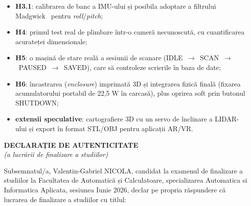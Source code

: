 \documentclass[a4paper,12pt,twoside,openany]{report}
\newcommand{\candidatname}{Valentin-Gabriel NICOLA}        %
\newcommand{\sessionname}{Iunie 2026}            %
\newcommand{\specializare}{Automatica si Informatica Aplicata}
\renewcommand{\bibname}{Bibliografie}
\begin{document}
\begin{itemize}\itemsep0pt
    \item \textbf{H3.1}: calibrarea de banc a IMU-ului și posibila adoptare
          a filtrului Madgwick~\cite{madgwick2014} pentru
          \textit{roll}/\textit{pitch};
    \item \textbf{H4}: primul test real de plimbare într-o cameră
          necunoscută, cu cuantificarea acurateței dimensionale;
    \item \textbf{H5}: o mașină de stare reală a sesiunii de scanare
          (IDLE~$\to$~SCAN~$\to$~PAUSED~$\to$~SAVED), care să controleze
          scrierile în baza de date;
    \item \textbf{H6}: încastrarea (\textit{enclosure}) imprimată 3D și
          integrarea fizică finală (fixarea acumulatorului portabil de
          22,5 W în carcasă), plus oprirea soft prin butonul SHUTDOWN;
    \item \textbf{extensii speculative}: cartografiere 3D cu un servo de
          înclinare a LIDAR-ului și export în format STL/OBJ pentru
          aplicații AR/VR.
\end{itemize}

\clearpage



\clearpage
\thispagestyle{coperta}

\begin{center}
{\fontsize{14pt}{17pt}\bfseries\MakeUppercase{Declarație de autenticitate}}\\[0.4cm]
{\fontsize{12pt}{14pt}\itshape (a lucrării de finalizare a studiilor)}
\end{center}

\vspace{0.8cm}

\noindent Subsemnatul/a, \candidatname{}, candidat la examenul de
finalizare a studiilor la Facultatea de Automatică și Calculatoare,
specializarea \specializare{}, sesiunea \sessionname{}, declar pe propria
răspundere că lucrarea de finalizare a studiilor cu titlul:
\end{document}
